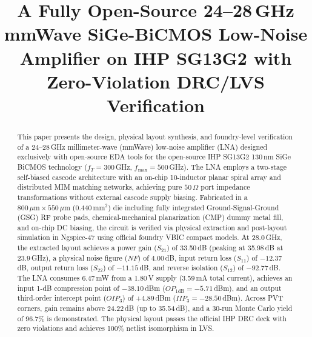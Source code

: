 \documentclass[conference]{IEEEtran}
\begin{document}
\title{A Fully Open-Source 24--28\,GHz mmWave SiGe-BiCMOS Low-Noise Amplifier on IHP SG13G2 with Zero-Violation DRC/LVS Verification}

\author{
}

\maketitle

\begin{abstract}
This paper presents the design, physical layout synthesis, and foundry-level verification of a 24--28\,GHz millimeter-wave (mmWave) low-noise amplifier (LNA) designed exclusively with open-source EDA tools for the open-source IHP SG13G2 130\,nm SiGe BiCMOS technology ($f_T = 300$\,GHz, $f_{\max} = 500$\,GHz). The LNA employs a two-stage self-biased cascode architecture with an on-chip 10-inductor planar spiral array and distributed MIM matching networks, achieving pure $50\,\Omega$ port impedance transformations without external cascode supply biasing. Fabricated in a $800\,\mu\text{m} \times 550\,\mu\text{m}$ ($0.440\,\text{mm}^2$) die including fully integrated Ground-Signal-Ground (GSG) RF probe pads, chemical-mechanical planarization (CMP) dummy metal fill, and on-chip DC biasing, the circuit is verified via physical extraction and post-layout simulation in Ngspice-47 using official foundry VBIC compact models. At 28.0\,GHz, the extracted layout achieves a power gain ($S_{21}$) of 33.50\,dB (peaking at 35.98\,dB at 23.9\,GHz), a physical noise figure ($NF$) of 4.00\,dB, input return loss ($S_{11}$) of $-12.37$\,dB, output return loss ($S_{22}$) of $-11.15$\,dB, and reverse isolation ($S_{12}$) of $-92.77$\,dB. The LNA consumes 6.47\,mW from a 1.80\,V supply (3.59\,mA total current), achieves an input 1-dB compression point of $-38.10$\,dBm ($OP_{1\mathrm{dB}} = -5.71$\,dBm), and an output third-order intercept point ($OIP_3$) of $+4.89$\,dBm ($IIP_3 = -28.50$\,dBm). Across PVT corners, gain remains above 24.22\,dB (up to 35.54\,dB), and a 30-run Monte Carlo yield of 96.7\% is demonstrated. The physical layout passes the official IHP DRC deck with zero violations and achieves 100\% netlist isomorphism in LVS.
\end{abstract}
\end{document}
